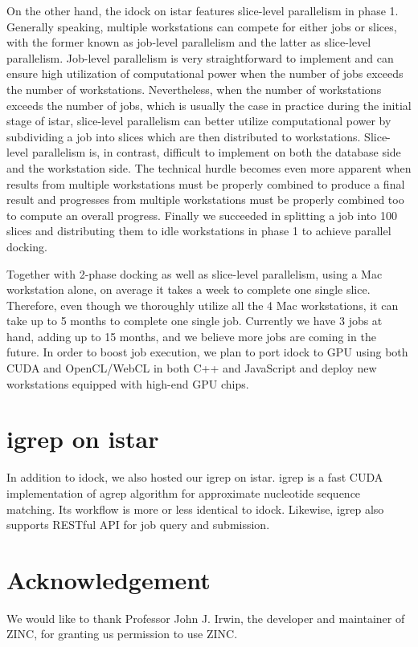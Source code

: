\documentclass{bioinfo}
\begin{document}
On the other hand, the idock on istar features slice-level parallelism in phase 1. Generally speaking, multiple workstations can compete for either jobs or slices, with the former known as job-level parallelism and the latter as slice-level parallelism. Job-level parallelism is very straightforward to implement and can ensure high utilization of computational power when the number of jobs exceeds the number of workstations. Nevertheless, when the number of workstations exceeds the number of jobs, which is usually the case in practice during the initial stage of istar, slice-level parallelism can better utilize computational power by subdividing a job into slices which are then distributed to workstations. Slice-level parallelism is, in contrast, difficult to implement on both the database side and the workstation side. The technical hurdle becomes even more apparent when results from multiple workstations must be properly combined to produce a final result and progresses from multiple workstations must be properly combined too to compute an overall progress. Finally we succeeded in splitting a job into 100 slices and distributing them to idle workstations in phase 1 to achieve parallel docking.

Together with 2-phase docking as well as slice-level parallelism, using a Mac workstation alone, on average it takes a week to complete one single slice. Therefore, even though we thoroughly utilize all the 4 Mac workstations, it can take up to 5 months to complete one single job. Currently we have 3 jobs at hand, adding up to 15 months, and we believe more jobs are coming in the future. In order to boost job execution, we plan to port idock to GPU using both CUDA and OpenCL/WebCL in both C++ and JavaScript and deploy new workstations equipped with high-end GPU chips.

\section{igrep on istar}

In addition to idock, we also hosted our igrep \citep{1138} on istar. igrep is a fast CUDA implementation of agrep algorithm for approximate nucleotide sequence matching. Its workflow is more or less identical to idock. Likewise, igrep also supports RESTful API for job query and submission.

\section*{Acknowledgement}

We would like to thank Professor John J. Irwin, the developer and maintainer of ZINC, for granting us permission to use ZINC.



\end{document}
